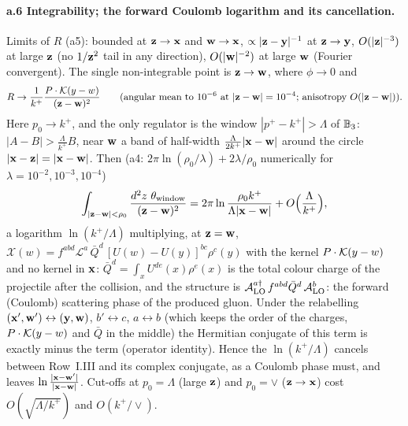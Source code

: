 \paragraph{a.6 Integrability; the forward Coulomb logarithm and its cancellation.} Limits of $R$ (a5): bounded at $\mathbf{z}\to\mathbf{x}$ and $\mathbf{w}\to\mathbf{x}$, $\propto|\mathbf{z}-\mathbf{y}|^{-1}$ at $\mathbf{z}\to\mathbf{y}$, $O(|\mathbf{z}|^{-3})$ at large $\mathbf{z}$ (no $1/\mathbf{z}^2$ tail in any direction), $O(|\mathbf{w}|^{-2})$ at large $\mathbf{w}$ (Fourier convergent). The single non-integrable point is $\mathbf{z}\to\mathbf{w}$, where $\phi\to0$ and
\begin{align}
R\to\frac{1}{k^+}\frac{P\cdot\mathcal{K}(y-w)}{(\mathbf{z}-\mathbf{w})^2}\qquad\text{(angular mean to }10^{-6}\text{ at }|\mathbf{z}-\mathbf{w}|=10^{-4}\text{; anisotropy }O(|\mathbf{z}-\mathbf{w}|)).
\end{align}
Here $p_0\to k^+$, and the only regulator is the window $|p^+-k^+|>\Lambda$ of $\mathbb{B}_3$: $|A-B|>\frac{\Lambda}{k^+}B$, near $\mathbf{w}$ a band of half-width $\frac{\Lambda}{2k^+}|\mathbf{x}-\mathbf{w}|$ around the circle $|\mathbf{x}-\mathbf{z}|=|\mathbf{x}-\mathbf{w}|$. Then (a4: $2\pi\ln(\rho_0/\lambda)+2\lambda/\rho_0$ numerically for $\lambda=10^{-2},10^{-3},10^{-4}$)
\begin{align}
\int_{|\mathbf{z}-\mathbf{w}|<\rho_0}\frac{d^2z\ \theta_{\rm window}}{(\mathbf{z}-\mathbf{w})^2}=2\pi\ln\frac{\rho_0k^+}{\Lambda|\mathbf{x}-\mathbf{w}|}+O\Big(\frac{\Lambda}{k^+}\Big),
\end{align}
a logarithm $\ln(k^+/\Lambda)$ multiplying, at $\mathbf{z}=\mathbf{w}$, $\mathcal X(w)=f^{abd}\mathcal L^a\,\bar Q^d\,[U(w)-U(y)]^{bc}\rho^c(y)$ with the kernel $P\cdot\mathcal{K}(y-w)$ and no kernel in $\mathbf{x}$: $\bar Q^d=\int_xU^{de}(x)\rho^e(x)$ is the total colour charge of the projectile after the collision, and the structure is $\mathcal A_{\rm LO}^{a\dagger}\,f^{abd}\bar Q^d\,\mathcal A_{\rm LO}^b$: the forward (Coulomb) scattering phase of the produced gluon. Under the relabelling $(\mathbf{x}',\mathbf{w}')\leftrightarrow(\mathbf{y},\mathbf{w})$, $b'\leftrightarrow c$, $a\leftrightarrow b$ (which keeps the order of the charges, $P\cdot\mathcal{K}(y-w)$ and $\bar Q$ in the middle) the Hermitian conjugate of this term is exactly minus the term (operator identity). Hence the $\ln(k^+/\Lambda)$ cancels between Row~I.III and its complex conjugate, as a Coulomb phase must, and leaves $\ln\frac{|\mathbf{x}-\mathbf{w}'|}{|\mathbf{x}-\mathbf{w}|}$. Cut-offs at $p_0=\Lambda$ (large $\mathbf{z}$) and $p_0=\vee$ ($\mathbf{z}\to\mathbf{x}$) cost $O(\sqrt{\Lambda/k^+})$ and $O(k^+/\vee)$.

